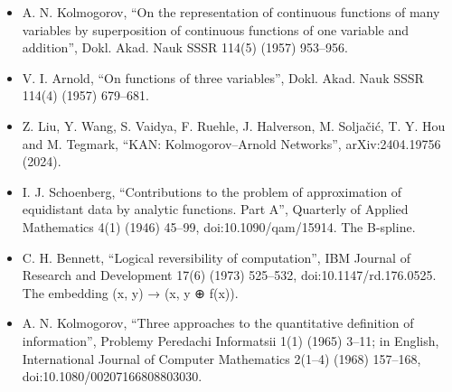 \begin{itemize}
\item A. N. Kolmogorov, “On the representation of continuous functions of many variables by superposition of continuous functions of one variable and addition”, Dokl. Akad. Nauk SSSR 114(5) (1957) 953–956.
\item V. I. Arnold, “On functions of three variables”, Dokl. Akad. Nauk SSSR 114(4) (1957) 679–681.
\item Z. Liu, Y. Wang, S. Vaidya, F. Ruehle, J. Halverson, M. Soljačić, T. Y. Hou and M. Tegmark, “KAN: Kolmogorov–Arnold Networks”, arXiv:2404.19756 (2024).
\item I. J. Schoenberg, “Contributions to the problem of approximation of equidistant data by analytic functions. Part A”, Quarterly of Applied Mathematics 4(1) (1946) 45–99, doi:10.1090/qam/15914. The B-spline.
\item C. H. Bennett, “Logical reversibility of computation”, IBM Journal of Research and Development 17(6) (1973) 525–532, doi:10.1147/rd.176.0525. The embedding (x, y) → (x, y ⊕ f(x)).
\item A. N. Kolmogorov, “Three approaches to the quantitative definition of information”, Problemy Peredachi Informatsii 1(1) (1965) 3–11; in English, International Journal of Computer Mathematics 2(1–4) (1968) 157–168, doi:10.1080/00207166808803030.
\end{itemize}
